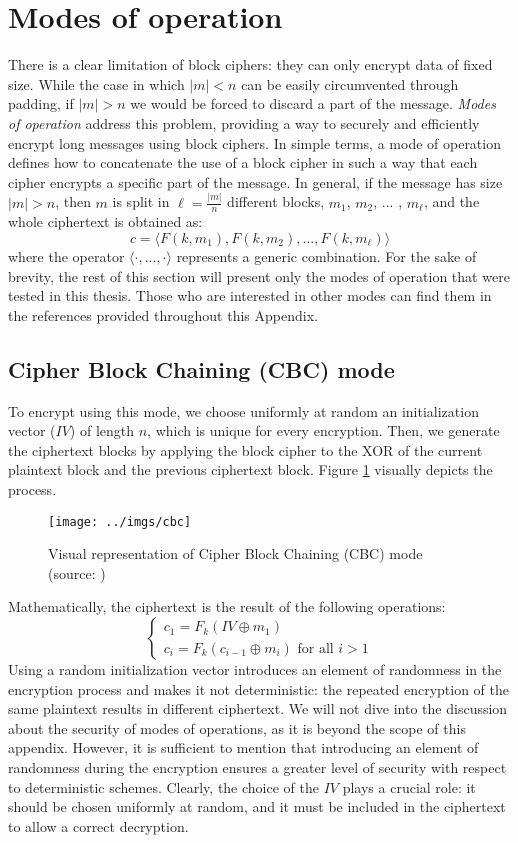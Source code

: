 \documentclass[12pt,a4paper]{book}
\theoremstyle{definition}
\begin{document}
	\section{Modes of operation}\label{sec:modes}
	There is a clear limitation of block ciphers: they can only encrypt data of fixed size. While the case in which $|m| < n$ can be easily circumvented through padding, if $|m| > n$ we would be forced to discard a part of the message. \textit{Modes of operation} address this problem, providing a way to securely and efficiently encrypt long messages using block ciphers. In simple terms, a mode of operation defines how to concatenate the use of a block cipher in such a way that each cipher encrypts a specific part of the message. In general, if the message has size $|m| > n$, then $m$ is split in $\ell = \frac{|m|}{n}$ different blocks, $m_1$, $m_2$, ... , $m_{\ell}$, and the whole ciphertext is obtained as:
	\[
	c = \langle F(k, m_1), F(k, m_2), ..., F(k, m_{\ell})\rangle
	\]
	where the operator $\langle \cdot , ..., \cdot \rangle$ represents a generic combination. For the sake of brevity, the rest of this section will present only the modes of operation that were tested in this thesis. Those who are interested in other modes can find them in the references provided throughout this Appendix.
	
	\subsection{Cipher Block Chaining (CBC) mode}
	To encrypt using this mode, we choose uniformly at random an initialization vector ($IV$) of length $n$, which is unique for every encryption. Then, we generate the ciphertext blocks by applying the block cipher to the XOR of the current plaintext block and the previous ciphertext block. Figure \ref{fig:cbc} visually depicts the process.
	\begin{figure}
		\centering
		\texttt{[image: ../imgs/cbc]}
		\captionsetup{width=.7\linewidth}
		\caption{Visual representation of Cipher Block Chaining (CBC) mode (source: \cite{Katz2007})}
		\label{fig:cbc}
	\end{figure}
	Mathematically, the ciphertext is the result of the following operations:
	\[
	\begin{cases}
		c_1 = F_k(IV \oplus m_1)\\
		c_i = F_k(c_{i-1}\oplus m_i) \text{ for all } i>1
	\end{cases}
	\]
	Using a random initialization vector introduces an element of randomness in the encryption process and makes it not deterministic: the repeated encryption of the same plaintext results in different ciphertext. 
	We will not dive into the discussion about the security of modes of operations, as it is beyond the scope of this appendix. However, it is sufficient to mention that introducing an element of randomness during the encryption ensures a greater level of security with respect to deterministic schemes. Clearly, the choice of the $IV$ plays a crucial role: it should be chosen uniformly at random, and it must be included in the ciphertext to allow a correct decryption.
	
\end{document}
